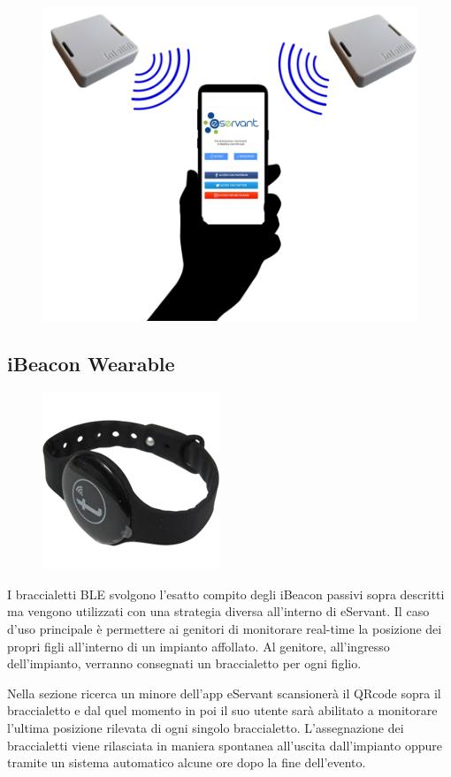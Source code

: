 \begin{figure}[H]
    \centering  
    \includegraphics[scale=0.4]{img/cap4/ibeacon-advertising}
\end{figure}

\subsection{iBeacon Wearable}
\begin{figure}[H]
    \centering  
    \includegraphics[scale=0.4]{img/cap4/wearable}
\end{figure}
I braccialetti BLE svolgono l'esatto compito degli iBeacon passivi sopra descritti ma vengono utilizzati
con una strategia diversa all'interno di eServant.
Il caso d'uso principale è permettere ai genitori di monitorare real-time la posizione dei propri
figli all'interno di un impianto affollato.
Al genitore, all'ingresso dell'impianto, verranno consegnati un braccialetto per ogni figlio.

Nella sezione ricerca un minore dell'app eServant scansionerà il QRcode sopra il braccialetto e dal quel momento
in poi il suo utente sarà abilitato a monitorare l'ultima posizione rilevata di ogni singolo braccialetto.
L'assegnazione dei braccialetti viene rilasciata in maniera spontanea all'uscita dall'impianto oppure 
tramite un sistema automatico alcune ore dopo la fine dell'evento.


